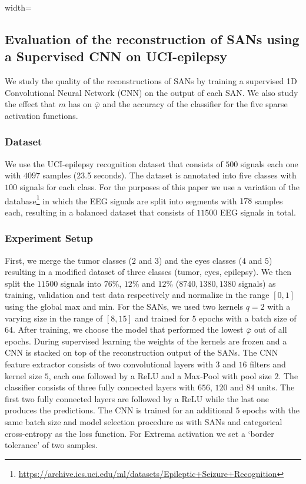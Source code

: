 \documentclass[journal]{IEEEtran}
\providecommand{\FILEPATH}{.}
\begin{document}
\begin{table}[!t]
  \centering
  \caption{Kernel sizes $m$ with the best $\bar\varphi$ for each
  sparse activations on Physionet databases}\label{table:crrl}
  \begin{adjustbox}{width=\textwidth}
    
  \end{adjustbox}
\end{table}
\subsection{Evaluation of the reconstruction of SANs using a
Supervised CNN on UCI-epilepsy}
We study the quality of the reconstructions of SANs by training a
supervised 1D Convolutional Neural Network (CNN) on the output of each SAN\@.
We also study the effect that $m$ has on $\bar\varphi$ and the
accuracy of the classifier for the five sparse activation functions.
\subsubsection{Dataset}
We use the UCI-epilepsy recognition dataset that consists of $500$
signals each one with $4097$ samples (23.5 seconds).
The dataset is annotated into five classes with $100$ signals for each class.
For the purposes of this paper we use a variation of the
database\footnote{\url{https://archive.ics.uci.edu/ml/datasets/Epileptic+Seizure+Recognition}}
in which the EEG signals are split into segments with $178$ samples
each, resulting in a balanced dataset that consists of $11500$ EEG
signals in total.
\subsubsection{Experiment Setup}
First, we merge the tumor classes ($2$ and $3$) and the eyes classes
($4$ and $5$) resulting in a modified dataset of three classes
(tumor, eyes, epilepsy).
We then split the $11500$ signals into $76\%$, $12\%$ and $12\%$
($8740,1380,1380$ signals) as training, validation and test data
respectively and normalize in the range $[0, 1]$ using the global max and min.
For the SANs, we used two kernels $q=2$ with a varying size in the
range of $[8, 15]$ and trained for $5$ epochs with a batch size of $64$.
After training, we choose the model that performed the lowest
$\bar\varphi$ out of all epochs.
During supervised learning the weights of the kernels are frozen and
a CNN is stacked on top of the reconstruction output of the SANs.
The CNN feature extractor consists of two convolutional layers with
$3$ and $16$ filters and kernel size $5$, each one followed by a ReLU
and a Max-Pool with pool size $2$.
The classifier consists of three fully connected layers with $656$,
$120$ and $84$ units.
The first two fully connected layers are followed by a ReLU while the
last one produces the predictions.
The CNN is trained for an additional $5$ epochs with the same batch
size and model selection procedure as with SANs and categorical
cross-entropy as the loss function.
For Extrema activation we set a `border tolerance' of two samples.
\end{document}
